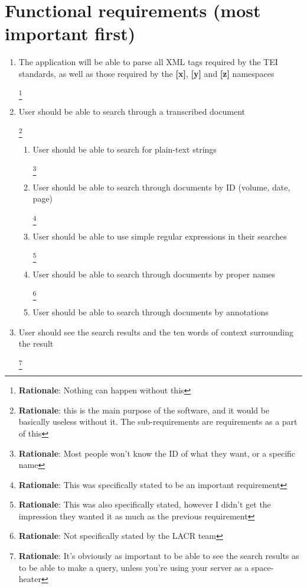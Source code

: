 \documentclass[10pt,a4paper]{report}
\newcommand{\rationale}[1]{
    \footnote{
        \textbf{Rationale}: #1
    }
}
\begin{document}
    \section*{Functional requirements (most important first)}
        \begin{enumerate}
            \item The application will be able to parse all XML tags required by the TEI standards, as well as those required by the \textbf{[x]}, \textbf{[y]} and \textbf{[z]} namespaces
            \rationale{Nothing can happen without this}

            \item User should be able to search through a transcribed document
            \rationale{this is the main purpose of the software, and it would be basically useless without it. The sub-requirements are requirements as a part of this}
                \begin{enumerate}
                    \item User should be able to search for plain-text strings
                    \rationale{Most people won't know the ID of what they want, or a specific name}
                    
                    \item User should be able to search through documents by ID (volume, date, page)
                    \rationale{This was specifically stated to be an important requirement}
                    
                    \item User should be able to use simple regular expressions in their searches
                    \rationale{This was also specifically stated, however I didn't get the impression they wanted it as much as the previous requirement}
                    
                    \item User should be able to search through documents by proper names
                    \rationale{Not specifically stated by the LACR team}
                    
                    \item User should be able to search through documents by  annotations
                \end{enumerate}    
            \item User should see the search results and the ten words of context surrounding the result
            \rationale{It's obviously as important to be able to see the search results as to be able to make a query, unless you're using your server as a space-heater}
            

\end{enumerate}
\end{document}
